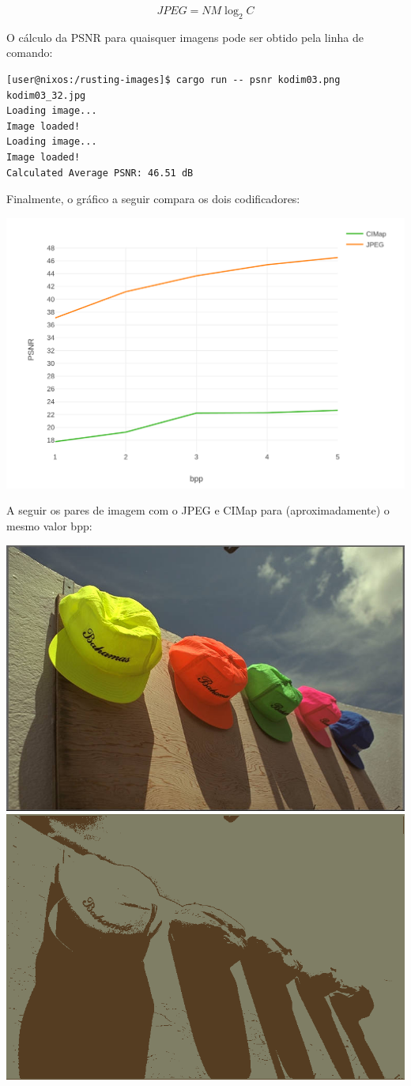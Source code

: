 \documentclass[11pt]{article}
\begin{document}
$$ JPEG = NM \log_2 C $$

O cálculo da PSNR para quaisquer imagens pode ser obtido pela linha de comando:

\begin{verbatim}
[user@nixos:/rusting-images]$ cargo run -- psnr kodim03.png kodim03_32.jpg
Loading image...
Image loaded!
Loading image...
Image loaded!
Calculated Average PSNR: 46.51 dB
\end{verbatim}

Finalmente, o gráfico a seguir compara os dois codificadores:

\begin{center}
\includegraphics[height=0.8\textwidth]{./graph.png}
\end{center}

A seguir os pares de imagem com o JPEG e CIMap para (aproximadamente) o mesmo valor bpp:

\begin{center}
\includegraphics[height=0.3\textwidth]{../assets/kodim03_2.jpg}
\includegraphics[height=0.3\textwidth]{../assets/kodim03_cimap_2.png}
\end{center}
\end{document}
